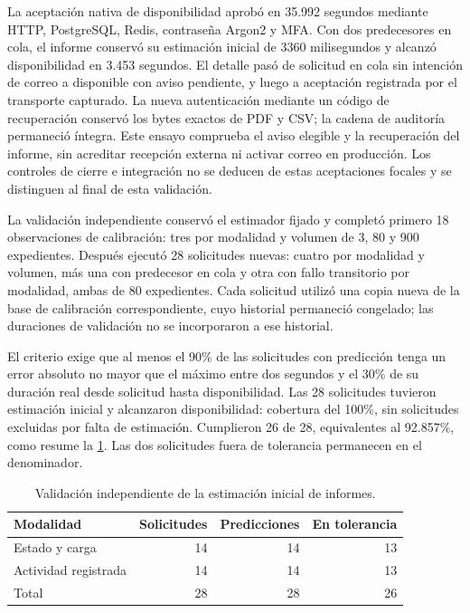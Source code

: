 La aceptaci\'on nativa de disponibilidad aprob\'o en 35.992 segundos mediante HTTP,
PostgreSQL, Redis, contrase\~na Argon2 y MFA. Con dos predecesores en cola, el
informe conserv\'o su estimaci\'on inicial de 3360 milisegundos y alcanz\'o
disponibilidad en 3.453 segundos. El detalle pas\'o de solicitud en cola sin
intenci\'on de correo a disponible con aviso pendiente, y luego a aceptaci\'on
registrada por el transporte capturado. La nueva autenticaci\'on mediante un
c\'odigo de recuperaci\'on conserv\'o los bytes exactos de PDF y CSV; la cadena de
auditor\'ia permaneci\'o \'integra. Este ensayo comprueba el aviso elegible y la
recuperaci\'on del informe, sin acreditar recepci\'on externa ni activar correo
en producci\'on. Los controles de cierre e integraci\'on no se deducen de estas
aceptaciones focales y se distinguen al final de esta validaci\'on.

La validaci\'on independiente conserv\'o el estimador fijado y complet\'o primero
18 observaciones de calibraci\'on: tres por modalidad y volumen de 3, 80 y 900
expedientes. Despu\'es ejecut\'o 28 solicitudes nuevas: cuatro por modalidad y
volumen, m\'as una con predecesor en cola y otra con fallo transitorio por
modalidad, ambas de 80 expedientes. Cada solicitud utiliz\'o una copia nueva de
la base de calibraci\'on correspondiente, cuyo historial permaneci\'o congelado;
las duraciones de validaci\'on no se incorporaron a ese historial.

El criterio exige que al menos el 90\% de las solicitudes con predicci\'on tenga
un error absoluto no mayor que el m\'aximo entre dos segundos y el 30\% de su
duraci\'on real desde solicitud hasta disponibilidad. Las 28 solicitudes tuvieron
estimaci\'on inicial y alcanzaron disponibilidad: cobertura del 100\%, sin
solicitudes excluidas por falta de estimaci\'on. Cumplieron 26 de 28, equivalentes
al 92.857\%, como resume la \cref{tab:precision-estimacion-informes}. Las dos
solicitudes fuera de tolerancia permanecen en el denominador.

\begin{table}[htbp]
  \centering
  \caption{Validaci\'on independiente de la estimaci\'on inicial de informes.}
  \label{tab:precision-estimacion-informes}
  \begin{tabularx}{\linewidth}{@{}Xrrr@{}}
    \toprule
    Modalidad & Solicitudes & Predicciones & En tolerancia \\
    \midrule
    Estado y carga & 14 & 14 & 13 \\
    Actividad registrada & 14 & 14 & 13 \\
    \midrule
    Total & 28 & 28 & 26 \\
    \bottomrule
  \end{tabularx}
\end{table}

